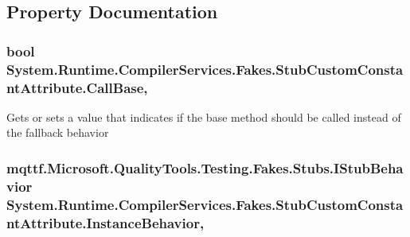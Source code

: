 \subsection{Property Documentation}
\hypertarget{class_system_1_1_runtime_1_1_compiler_services_1_1_fakes_1_1_stub_custom_constant_attribute_aa56e73afe5bfe8399547359475178077}{
\subsubsection[{Call\-Base}]{\setlength{\rightskip}{0pt plus 5cm}bool System.\-Runtime.\-Compiler\-Services.\-Fakes.\-Stub\-Custom\-Constant\-Attribute.\-Call\-Base\hspace{0.3cm}{\ttfamily [get]}, {\ttfamily [set]}}}\label{class_system_1_1_runtime_1_1_compiler_services_1_1_fakes_1_1_stub_custom_constant_attribute_aa56e73afe5bfe8399547359475178077}


Gets or sets a value that indicates if the base method should be called instead of the fallback behavior

\hypertarget{class_system_1_1_runtime_1_1_compiler_services_1_1_fakes_1_1_stub_custom_constant_attribute_a735abd525fdf96d722bf39f08f0c607e}{
\subsubsection[{Instance\-Behavior}]{\setlength{\rightskip}{0pt plus 5cm}mqttf.\-Microsoft.\-Quality\-Tools.\-Testing.\-Fakes.\-Stubs.\-I\-Stub\-Behavior System.\-Runtime.\-Compiler\-Services.\-Fakes.\-Stub\-Custom\-Constant\-Attribute.\-Instance\-Behavior\hspace{0.3cm}{\ttfamily [get]}, {\ttfamily [set]}}}\label{class_system_1_1_runtime_1_1_compiler_services_1_1_fakes_1_1_stub_custom_constant_attribute_a735abd525fdf96d722bf39f08f0c607e}


